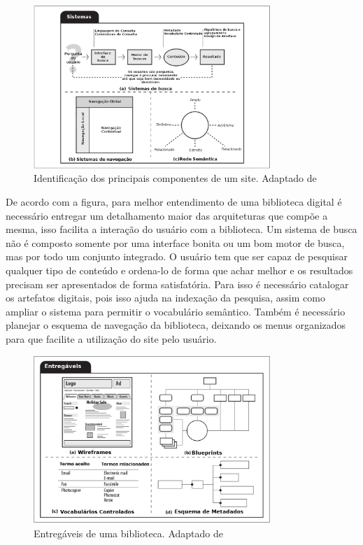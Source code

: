 \graphicspath{{figuras/}}
\begin{figure}[H]
\centering
\includegraphics[width=0.8\textwidth]{sistemas}
\caption[Identificação dos principais componentes de uma biblioteca]{Identificação dos principais componentes de um site. Adaptado de \cite{rosenfeld2002information}}
\label{fig:sistemasoftware}
\end{figure}

De acordo com a figura, para melhor entendimento de uma biblioteca digital é necessário entregar um detalhamento maior das arquiteturas que compõe a mesma, isso facilita a interação do usuário com a biblioteca. Um sistema de busca não é composto somente por uma interface bonita ou um bom motor de busca, mas por todo um conjunto integrado. O usuário tem que ser capaz de pesquisar qualquer tipo de conteúdo e ordena-lo de forma que achar melhor e os resultados precisam ser apresentados de forma satisfatória. Para isso é necessário catalogar os artefatos digitais, pois isso ajuda na indexação da pesquisa, assim como ampliar o sistema para permitir o vocabulário semântico. Também é necessário planejar o esquema de navegação da biblioteca, deixando os menus organizados para que facilite a utilização do site pelo usuário.

\graphicspath{{figuras/}}
\begin{figure}[H]
\centering
\includegraphics[width=0.8\textwidth]{entregaveis}
\caption[Entregáveis de uma biblioteca]{Entregáveis de uma biblioteca. Adaptado de \cite{rosenfeld2002information}}
\label{fig:entregaveissoftware}
\end{figure}

